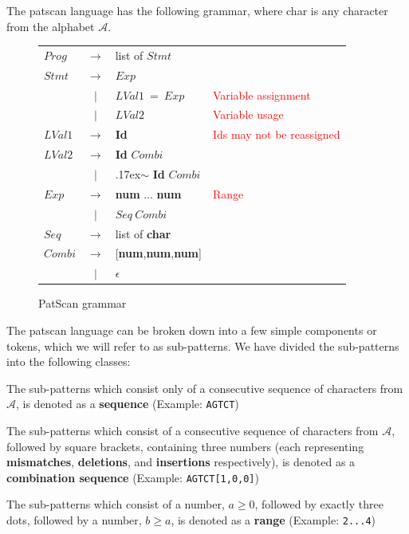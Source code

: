 \documentclass[12pt]{article}
\theoremstyle{definition}
\begin{document}
The patscan language has the following grammar, where char is any character from the alphabet $\mathcal{A}$.

\begin{figure}[H]
\begin{center}
\begin{tabular}{|lcll|}
	\hline
	$Prog$ &  $\rightarrow$ & list of $Stmt$ & \\
	$Stmt$ & $\rightarrow$ & $Exp$ & \\
	\enspace & $|$ & $LVal1\ =\ Exp$ &  \textcolor{red}{Variable assignment} \\
	\enspace & $|$ & $LVal2$ & \textcolor{red}{Variable usage} \\
	$LVal1$ & $\rightarrow$ & \textbf{Id} & \textcolor{red}{Ids may not be reassigned}\\
	$LVal2$ & $\rightarrow$ & \textbf{Id} $Combi$ & \\
	\enspace & $|$ & {\raise.17ex\hbox{$\scriptstyle\mathtt{\sim}$}} \textbf{Id} $Combi$ & \\
	$Exp$ & $\rightarrow$ & \textbf{num} ... \textbf{num} & \textcolor{red}{Range} \\
	\enspace & $|$ & $Seq\ Combi$ & \\
	$Seq$ & $\rightarrow$ & list of \textbf{char} & \\
	$Combi$ & $\rightarrow$ & [\textbf{num},\textbf{num},\textbf{num}] & \\
	\enspace & $|$ & $\epsilon$ & \\
	\hline
\end{tabular}
\end{center}
\caption{PatScan grammar}
\end{figure}

The patscan language can be broken down into a few simple components or tokens, which we will refer to as sub-patterns. We have divided the sub-patterns into the following classes:

The sub-patterns which consist only of a consecutive sequence of characters from $\mathcal{A}$, is denoted as a \textbf{sequence} (Example: \texttt{AGTCT})

The sub-patterns which consist of a consecutive sequence of characters from $\mathcal{A}$, followed by square brackets, containing three numbers (each representing \textbf{mismatches}, \textbf{deletions}, and \textbf{insertions} respectively), is denoted as a \textbf{combination sequence} (Example: \texttt{AGTCT[1,0,0]})

The sub-patterns which consist of a number, $a \geq 0$, followed by exactly three dots, followed by a number, $b \geq a$, is denoted as a \textbf{range} (Example: \texttt{2...4})
\end{document}
